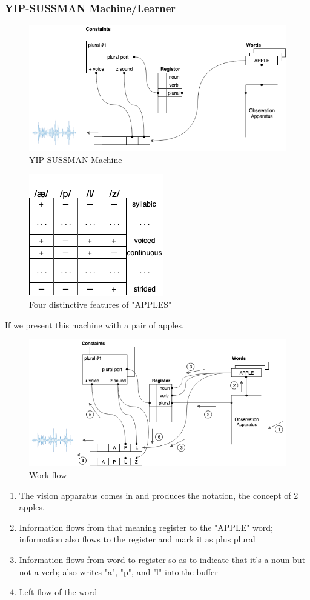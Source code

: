 \documentclass[12pt]{book}
\begin{document}
\subsubsection{YIP-SUSSMAN Machine/Learner}
\begin{figure}[ht]
	\centering
	\includegraphics[scale=0.65]{Figure/Figure14_3.png}
	\caption{YIP-SUSSMAN Machine}
\end{figure}
\newpage
\begin{figure}[ht]
	\centering
	\includegraphics[scale=0.6]{Figure/Figure14_4.png}
	\caption{Four distinctive features of "APPLES"}
\end{figure}
If we present this machine with a pair of apples.
\begin{figure}[ht]
	\centering
	\includegraphics[scale=0.65]{Figure/Figure14_5.png}
	\caption{Work flow}
\end{figure}
\begin{enumerate}
	\item The vision apparatus comes in and produces the notation, the concept of 2 apples.
	\item Information flows from that meaning register to the "APPLE" word; information also flows to the register and mark it as plus plural
	\item Information flows from word to register so as to indicate that it's a noun but not a verb; also writes "a", "p", and "l" into the buffer
	\item Left flow of the word
\end{enumerate}
\end{document}

